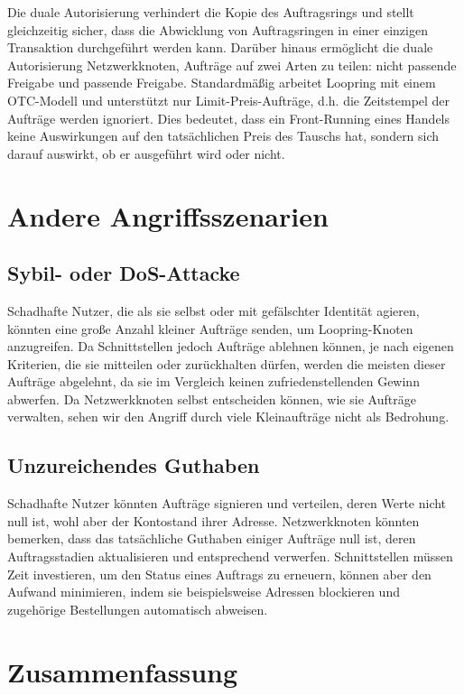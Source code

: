 \documentclass[UTF8,nofonts]{article}
\begin{document}
\begin{multicols}{2}
\begin{itemize}
\end{itemize}

Die duale Autorisierung verhindert die Kopie des Auftragsrings und stellt gleichzeitig sicher, dass die Abwicklung von Auftragsringen in einer einzigen Transaktion durchgeführt werden kann. Darüber hinaus ermöglicht die duale Autorisierung Netzwerkknoten, Aufträge auf zwei Arten zu teilen: nicht passende Freigabe und passende Freigabe. Standardmäßig arbeitet Loopring mit einem OTC-Modell und unterstützt nur Limit-Preis-Aufträge, d.h. die Zeitstempel der Aufträge werden ignoriert. Dies bedeutet, dass ein Front-Running eines Handels keine Auswirkungen auf den tatsächlichen Preis des Tauschs hat, sondern sich darauf auswirkt, ob er ausgeführt wird oder nicht.

\section{Andere Angriffsszenarien}

\subsection{Sybil- oder DoS-Attacke}
Schadhafte Nutzer, die als sie selbst oder mit gefälschter Identität agieren, könnten eine große Anzahl kleiner Aufträge senden, um Loopring-Knoten anzugreifen. Da Schnittstellen jedoch Aufträge ablehnen können, je nach eigenen Kriterien, die sie mitteilen oder zurückhalten dürfen, werden die meisten dieser Aufträge abgelehnt, da sie im Vergleich keinen zufriedenstellenden Gewinn abwerfen. Da Netzwerkknoten selbst entscheiden können, wie sie Aufträge verwalten, sehen wir den Angriff durch viele Kleinaufträge nicht als Bedrohung.

\subsection{Unzureichendes Guthaben}
Schadhafte Nutzer könnten Aufträge signieren und verteilen, deren Werte nicht null ist, wohl aber der Kontostand ihrer Adresse. Netzwerkknoten könnten bemerken, dass das tatsächliche Guthaben einiger Aufträge null ist, deren Auftragsstadien aktualisieren und entsprechend verwerfen. Schnittstellen müssen Zeit investieren, um den Status eines Auftrags zu erneuern, können aber den Aufwand minimieren, indem sie beispielsweise Adressen blockieren und zugehörige Bestellungen automatisch abweisen.

\section{Zusammenfassung}


\end{multicols}
\end{document}
